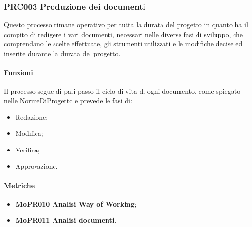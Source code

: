 \documentclass[../piano-di-qualifica.tex]{subfiles}
\begin{document}
\subsubsection{PRC003 Produzione dei documenti}
\label{sub:produzione_dei_documenti}
Questo processo rimane operativo per tutta la durata del progetto in quanto ha il compito di redigere i vari documenti, necessari nelle diverse fasi di sviluppo, che comprendano le scelte effettuate, gli strumenti utilizzati e le modifiche decise ed inserite durante la durata del progetto.

\paragraph{Funzioni}
\label{sub:funzioni_3}
Il processo segue di pari passo il ciclo di vita di ogni documento, come spiegato nelle NormeDiProgetto e prevede le fasi di:
\begin{itemize}
    \item Redazione;
    \item Modifica;
    \item Verifica;
    \item Approvazione.        
\end{itemize}

\paragraph{Metriche}
\label{sub:metriche_3}
\begin{itemize}
    \item \textbf{MoPR010 Analisi Way of Working};
    \item \textbf{MoPR011 Analisi documenti}.
\end{itemize}
\end{document}
